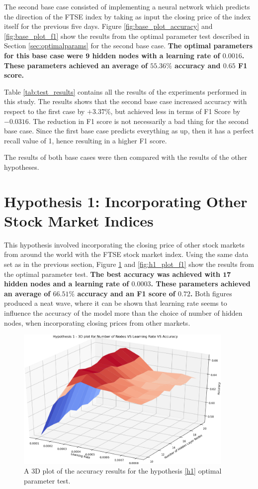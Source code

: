 \documentclass{UoYCSproject}
\begin{document}
The second base case consisted of implementing a neural network which predicts the direction of the FTSE index by taking as input the closing price of the index itself for the previous five days. Figure \ref{fig:base_plot_accuracy} and \ref{fig:base_plot_f1} show the results from the optimal parameter test described in Section \ref{sec:optimalparams} for the second base  case. \textbf{The optimal parameters for this base case were $\boldsymbol{9}$ hidden nodes with a learning rate of $\boldsymbol{0.0016}$. These parameters achieved an average of $\boldsymbol{55.36\%}$ accuracy and $\boldsymbol{0.65}$ F1 score.}

Table \ref{tab:test_results} contains all the results of the experiments performed in this study. The results shows that the second base case increased accuracy with respect to the first case by $+3.37$\%, but achieved less in terms of F1 Score by $-0.0316$. The reduction in F1 score is not necessarily a bad thing for the second base case. Since the first base case predicts everything as up, then it has a perfect recall value of 1, hence resulting in a higher F1 score. 

The results of both base cases were then compared with the results of the other hypotheses.

\section{Hypothesis 1: Incorporating Other Stock Market Indices}
This hypothesis involved incorporating the closing price of other stock markets from around the world with the FTSE stock market index. Using the same data set as in the previous section, Figure \ref{fig:h1_plot_accuracy} and \ref{fig:h1_plot_f1} show the results from the optimal parameter test. \textbf{The best accuracy was achieved with $\boldsymbol{17}$ hidden nodes and a learning rate of $\boldsymbol{0.0003}$. These parameters achieved an average of $\boldsymbol{66.51\%}$ accuracy and an F1 score of $\boldsymbol{0.72}$.} Both figures produced a neat wave, where it can be shown that learning rate seems to influence the accuracy of the model more than the choice of number of hidden nodes, when incorporating closing prices from other markets. 

\begin{figure}[h]
\includegraphics[width=10.5cm]{h1_accuracy.png}
\centering
\caption{A 3D plot of the accuracy results for the hypothesis \ref{h1} optimal parameter test.} 
\label{fig:h1_plot_accuracy}
\end{figure}
\end{document}

